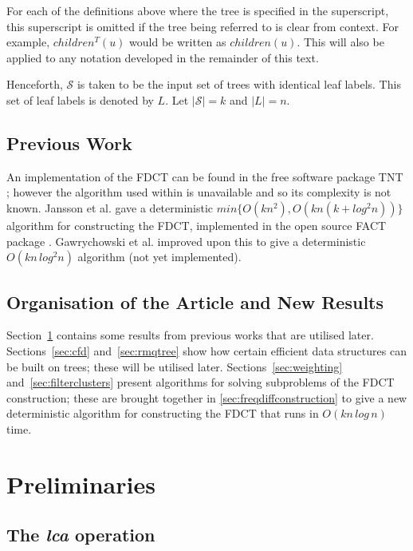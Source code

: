 \documentclass{article}
\begin{document}
    For each of the definitions above where the tree is specified in the superscript, this superscript is omitted if the tree being referred to is clear from context. For example, $children^T(u)$ would be written as $children(u)$. This will also be applied to any notation developed in the remainder of this text.

    Henceforth, $\mathcal{S}$ is taken to be the input set of trees with identical leaf labels. This set of leaf labels is denoted by $L$. Let $|\mathcal{S}| = k$ and $|L| = n$.

    \subsection{Previous Work}
    An implementation of the FDCT can be found in the free software package TNT \cite{goloboff2008tnt}; however the algorithm used within is unavailable and so its complexity is not known. Jansson et al. \cite{jansson2018algorithms} gave a deterministic $min\{O(kn^2), O(kn(k + log^2 n))\}$ algorithm for constructing the FDCT, implemented in the open source FACT package \cite{jansson2016improved}. Gawrychowski et al. \cite{gawrychowski2017faster} improved upon this to give a deterministic $O(kn\,log^2n)$ algorithm (not yet implemented).

    \subsection{Organisation of the Article and New Results}
    Section~\ref{sec:preliminaries} contains some results from previous works that are utilised later. Sections~\ref{sec:cfd} and~\ref{sec:rmqtree} show how certain efficient data structures can be built on trees; these will be utilised later. Sections~\ref{sec:weighting} and~\ref{sec:filterclusters} present algorithms for solving subproblems of the FDCT construction; these are brought together in \ref{sec:freqdiffconstruction} to give a new deterministic algorithm for constructing the FDCT that runs in $O(kn\,log\,n)$ time.

    \section{Preliminaries}
    \label{sec:preliminaries}

    \subsection{The \textit{lca} operation}
\end{document}
